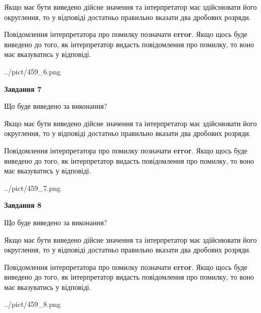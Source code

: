 \documentclass[12pt, ukrainian]{article}
\begin{document}
{\begin {Large}
Якщо має бути виведено дійсне значення та інтерпретатор має здійснювати його округлення, 
то у відповіді достатньо правильно вказати два дробових розряди.

Повідомлення інтерпретатора про помилку позначати \textbf{error}.
Якщо щось буде виведено до того, як інтерпретатор видасть повідомлення про помилку, 
то воно має вказуватись у відповіді. \par

\begin{center}
	{../pict/459_6.png}
\end{center}
\newpage

{\begin {center}\textbf{Завдання 7}\end {center}}\par
Що буде виведено за виконання? \par

Якщо має бути виведено дійсне значення та інтерпретатор має здійснювати його округлення, 
то у відповіді достатньо правильно вказати два дробових розряди.

Повідомлення інтерпретатора про помилку позначати \textbf{error}.
Якщо щось буде виведено до того, як інтерпретатор видасть повідомлення про помилку, 
то воно має вказуватись у відповіді. \par

\begin{center}
	{../pict/459_7.png}
\end{center}
\newpage

{\begin {center}\textbf{Завдання 8}\end {center}}\par
Що буде виведено за виконання? \par

Якщо має бути виведено дійсне значення та інтерпретатор має здійснювати його округлення, 
то у відповіді достатньо правильно вказати два дробових розряди.

Повідомлення інтерпретатора про помилку позначати \textbf{error}.
Якщо щось буде виведено до того, як інтерпретатор видасть повідомлення про помилку, 
то воно має вказуватись у відповіді. \par

\begin{center}
	{../pict/459_8.png}
\end{center}
\newpage


\end{Large}}
\end{document}
